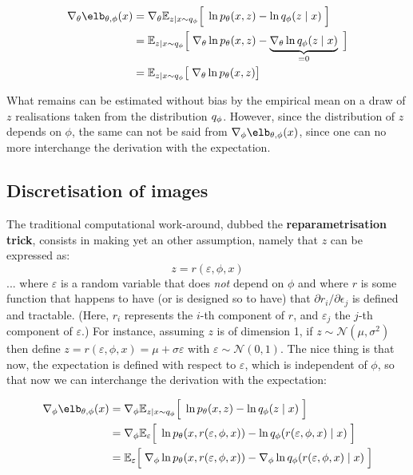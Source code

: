 \documentclass{article}
\begin{document}
\begin{appendix}
\begin{align*}
\nabla_\theta\elb_{\theta,\phi}(x) & = \nabla_\theta \esp_{z|x \sim q_\phi} \Big[ \; \ln  \pt(x, z) -\ln \qp(z \mid x)  \; \Big] \\
& = \esp_{z|x \sim q_\phi} \Big[ \; \nabla_\theta \ln \pt(x, z) - \underbrace{ \nabla_\theta \ln \qp(z \mid x) }_{= 0} \; \Big] \\
& = \esp_{z|x \sim q_\phi} \big[ \; \nabla_\theta \ln \pt(x, z)\big] \\
\end{align*}

What remains can be estimated without bias by the empirical mean on a draw of $z$ realisations taken from the distribution $q_\phi$.
However, since the distribution of $z$ depends on $\phi$, the same can not be said from $\nabla_\phi\elb_{\theta,\phi}(x)$, since one can no more interchange the derivation with the expectation.


\subsection{Discretisation of images}

The traditional computational work-around, dubbed the \textbf{reparametrisation trick}, consists in making yet an other assumption, namely that $z$ can be expressed as:
$$z=r(\varepsilon, \phi, x)$$
... where $\varepsilon$ is a random variable that does \textit{not} depend on $\phi$ and where $r$ is some function that happens to have (or is designed so to have) that $\partial r_i / \partial \epsilon_j$ is defined and tractable. (Here, $r_i$ represents the $i$-th component of $r$, and $\varepsilon_j$ the $j$-th component of $\varepsilon$.) For instance, assuming $z$ is of dimension 1, if $z\sim \mathcal{N}(\mu,\sigma^2)$ then define $z=r(\varepsilon, \phi, x)=\mu+\sigma \varepsilon$ with $\varepsilon\sim\mathcal{N}(0,1)$. The nice thing is that now, the expectation is defined with respect to $\varepsilon$, which is independent of $\phi$, so that now we can interchange the derivation with the expectation:

\begin{align*}
\nabla_\phi\elb_{\theta,\phi}(x) & = \nabla_\phi \esp_{z|x \sim q_\phi} \Big[ \; \ln  \pt(x, z) -\ln \qp(z \mid x)  \; \Big] \\
& = \nabla_\phi \esp_{\varepsilon} \Big[ \; \ln  \pt(x, r(\varepsilon,\phi,x)) -\ln \qp(r(\varepsilon,\phi,x) \mid x)  \; \Big] \\
& = \esp_{\varepsilon} \Big[ \; \nabla_\phi \ln  \pt(x, r(\varepsilon,\phi,x)) - \nabla_\phi \ln \qp(r(\varepsilon,\phi,x) \mid x)  \; \Big]
\end{align*}


\end{appendix}
\end{document}
